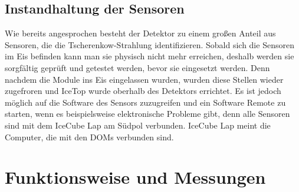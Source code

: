     \subsection{Instandhaltung der Sensoren}

    Wie bereits angesprochen besteht der Detektor zu einem großen Anteil aus Sensoren, 
    die die Tscherenkow-Strahlung identifizieren. Sobald sich die Sensoren im Eis befinden kann man sie 
    physisch nicht mehr erreichen, deshalb werden sie sorgfältig geprüft und getestet werden, 
    bevor sie eingesetzt werden. Denn nachdem die Module ins Eis eingelassen wurden, wurden diese 
    Stellen wieder zugefroren und IceTop wurde oberhalb des Detektors errichtet. Es ist jedoch möglich 
    auf die Software des Sensors zuzugreifen und ein Software Remote zu starten, wenn es beispielsweise 
    elektronische Probleme gibt, denn alle Sensoren sind mit dem IceCube Lap am Südpol verbunden. IceCube 
    Lap meint die Computer, die mit den DOMs verbunden sind. \cite{FAQ13}

    \section{Funktionsweise und Messungen}

